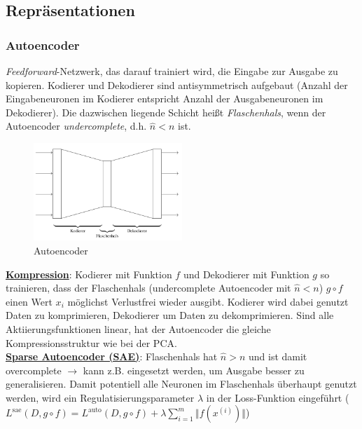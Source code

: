 
\subsection{Repräsentationen}
\label{representations}
\subsubsection{Autoencoder}

\emph{Feedforward}-Netzwerk, das darauf trainiert wird, die Eingabe zur Ausgabe zu kopieren. Kodierer und Dekodierer sind antisymmetrisch aufgebaut (Anzahl der Eingabeneuronen im Kodierer entspricht Anzahl der Ausgabeneuronen im Dekodierer). Die dazwischen liegende Schicht heißt \emph{Flaschenhals}, wenn der Autoencoder \emph{undercomplete}, d.h. $\hat{n}<n$ ist.\\

\begin{figure}[H]
    \centering
    \includegraphics[width=0.5\textwidth]{deepLearning/autoencoder.png}
    \caption{Autoencoder}
\end{figure}

\underline{\textbf{Kompression}}: Kodierer mit Funktion $f$ und Dekodierer mit Funktion $g$ so trainieren, dass der Flaschenhals (undercomplete Autoencoder mit $\hat{n}<n$) $g\circ f$ einen Wert $x_i$ möglichst Verlustfrei wieder ausgibt. Kodierer wird dabei genutzt Daten zu komprimieren, Dekodierer um Daten zu dekomprimieren. Sind alle Aktiierungsfunktionen linear, hat der Autoencoder die gleiche Kompressionsstruktur wie bei der PCA.\\

\underline{\textbf{Sparse Autoencoder (SAE)}}: Flaschenhals hat $\hat{n}>n$ und ist damit overcomplete $\rightarrow$ kann z.B. eingesetzt werden, um Ausgabe besser zu generalisieren. Damit potentiell alle Neuronen im Flaschenhals überhaupt genutzt werden, wird ein Regulatisierungsparameter $\lambda$ in der Loss-Funktion eingeführt ($L^\text{sae}(D, g\circ f)=L^\text{auto}(D, g\circ f)+\lambda\sum_{i=1}^{m}\Vert f(x^{(i)})\Vert$)\\

